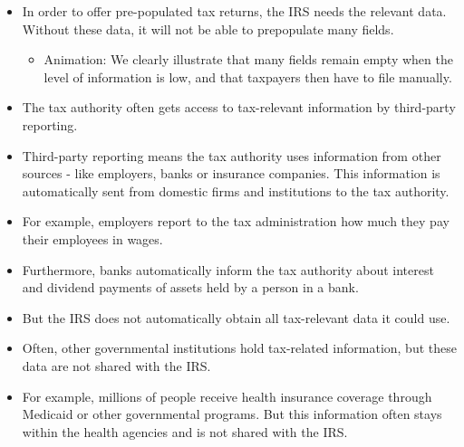 \documentclass[11pt]{article}
\begin{document}
\begin{itemize}
    \begin{itemize}
        \item Animation: We show what a prepopulated tax return looks like and clearly visualise that many/most fields are already prepopulated, thus reducing the taxpayer's filing burden. 
    \end{itemize}
    \item In order to offer pre-populated tax returns, the IRS needs the relevant data. Without these data, it will not be able to prepopulate many fields.
    \begin{itemize}
        \item Animation: We clearly illustrate that many fields remain empty when the level of information is low, and that taxpayers then have to file manually.
    \end{itemize}
    \item The tax authority often gets access to tax-relevant information by third-party reporting. 
    \item Third-party reporting means the tax authority uses information from other sources - like employers, banks or insurance companies. This information is automatically sent from domestic firms and institutions to the tax authority.
    \item For example, employers report to the tax administration how much they pay their employees in wages.
    \item Furthermore, banks automatically inform the tax authority about interest and dividend payments of assets held by a person in a bank.
    \item But the IRS does not automatically obtain all tax-relevant data it could use. 
    \item Often, other governmental institutions hold tax-related information, but these data are not shared with the IRS.
    \item For example, millions of people receive health insurance coverage through Medicaid or other governmental programs. But this information often stays within the health agencies and is not shared with the IRS. %

\end{itemize}
\end{document}
